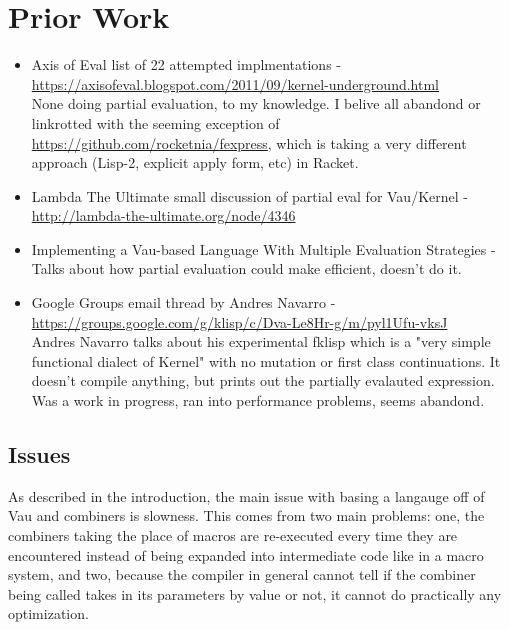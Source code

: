 \documentclass[acmsmall]{acmart}
\begin{document}
\section{Prior Work}
\begin{itemize}
    \item{} Axis of Eval list of 22 attempted implmentations - \url{https://axisofeval.blogspot.com/2011/09/kernel-underground.html} \\ 
      None doing partial evaluation, to my knowledge. I belive all abandond or linkrotted with the seeming exception of \url{https://github.com/rocketnia/fexpress},
      which is taking a very different approach (Lisp-2, explicit apply form, etc) in Racket.
    \item{} Lambda The Ultimate small discussion of partial eval for Vau/Kernel - \url{http://lambda-the-ultimate.org/node/4346}
    \item{} Implementing a Vau-based Language With Multiple Evaluation Strategies - \cite{kearsleyimplementing} \\
      Talks about how partial evaluation could make efficient, doesn't do it.
    \item{} Google Groups email thread by Andres Navarro - \url{https://groups.google.com/g/klisp/c/Dva-Le8Hr-g/m/pyl1Ufu-vksJ} \\
      Andres Navarro talks about his experimental fklisp which is a "very simple functional dialect of Kernel" with no mutation or first class continuations.
      It doesn't compile anything, but prints out the partially evalauted expression. Was a work in progress, ran into performance problems, seems abandond.
\end{itemize}

\subsection{Issues}
  As described in the introduction, the main issue with basing a langauge off of Vau and combiners is slowness.
  This comes from two main problems: one, the combiners taking the place of macros are re-executed every time
  they are encountered instead of being expanded into intermediate code like in a macro system, and two, because
  the compiler in general cannot tell if the combiner being called takes in its parameters by value or not, it cannot
  do practically any optimization.
\end{document}
